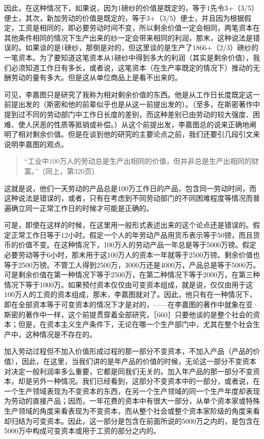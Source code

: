 因此，在这种情况下，如果说，因为1磅纱的价值是既定的，等于1先令3+（3/5）便士，其次，新加劳动的价值是既定的，等于3+（3/5）便士，并且因为根据假定，工资是相同的，即必要劳动时间不变，所以剩余价值一定会相同，两笔资本在其他条件相同的情况下生产出来的纱一定会带来相同的利润，那末，这种说法是错误的。如果谈的是1磅纱，那倒是对的，但这里谈的是生产了1866+（2/3）磅纱的一笔资本。为了要知道这笔资本从1磅纱中得到多大的利润（其实是剩余价值），我们必须知道工作日有多长，或者说，这笔资本（在生产率既定的情况下）推动的无酬劳动的量有多大。但是这从单位商品上是看不出来的。

可见，李嘉图只是研究了我称为相对剩余价值的东西。他是从工作日长度既定这一前提出发的（斯密和他的前辈似乎也是从这一前提出发的）。（至多，在斯密著作中提到过不同的劳动部门中工作日长度的差别，而这种差别已由劳动的较大强度、困难、使人厌恶的性质等抵销或补偿。）从这个前提出发，李嘉图总的说来正确地阐明了相对剩余价值。但是在谈到他的研究的主要论点之前，我们还要引几段引文来说明李嘉图的观点。

\begin{quote}{“工业中100万人的劳动总是生产出相同的价值，但并非总是生产出相同的财富。”（同上，第320页）}\end{quote}

这就是说，他们一天劳动的产品总是100万工作日的产品，包含同一劳动时间，而这种说法是错误的，或者，只有在考虑到不同劳动部门的不同困难程度等情况而普遍确立同一正常工作日的时候才可能是正确的。

可是，即使在这样的时候，在这里用一般形式表述出来的这个论点还是错误的。假定正常工作日等于12小时。假定一个人的年劳动产品用货币表示等于50镑，而且货币的价值不变。在这种情况下，100万人的劳动产品一年总是等于5000万镑。假定必要劳动等于6小时，那末用于这100万人的资本一年就等于2500万镑。剩余价值也等于2500万镑。不管工人得到2500万，3000万还是4000万，产品总是等于5000万。可是剩余价值在第一种情况下等于2500万，在第二种情况下等于2000万，在第三种情况下等于1000万。如果预付资本仅仅由可变资本组成，就是说，仅仅由用于这100万人的工资的资本组成，那末，李嘉图就对了。因此，他只有在一种情况下，即在全部资本等于可变资本的情况下才是对的，——在李嘉图的著作中就象在亚·斯密的著作中一样，这个前提贯穿着全部研究，［660］只要他谈的是整个社会的资本；但是，在资本主义生产条件下，无论在哪一个生产部门中，尤其在整个社会生产中，这种情况是不存在的。

加入劳动过程但不加入价值形成过程的那一部分不变资本，不加入产品（产品的价值），因此，在这里，当我们讲的是年产品的价值的时候，无论这一部分不变资本对决定一般利润率多么重要，它都是同我们无关的。加入年产品的那一部分不变资本，却是另外一种情况。我们已经看到，这部分不变资本中的一部分，或者说，在一个生产领域表现为不变资本的东西，在另一个生产领域的同一个生产年度却表现为劳动的直接产品；因而，一年花费的资本中有很大一部分，从单个资本家或特殊生产领域的角度来看表现为不变资本，而从整个社会或整个资本家阶级的角度来看却归结为可变资本。因此，这一部分是包含在前面所说的5000万之内的，是包含在5000万中构成可变资本或用于工资的部分之内的。

